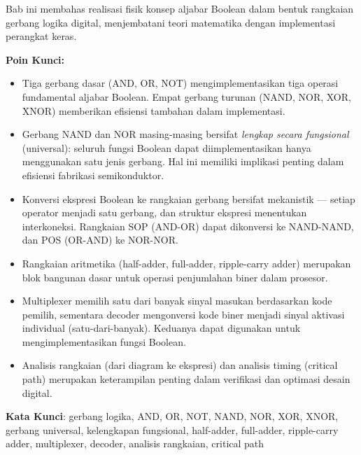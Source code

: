 \documentclass[../main]{subfiles}
\begin{document}
\begin{rangkuman}
Bab ini membahas realisasi fisik konsep aljabar Boolean dalam bentuk rangkaian gerbang logika digital, menjembatani teori matematika dengan implementasi perangkat keras.

\textbf{Poin Kunci:}
\begin{itemize}
  \item Tiga gerbang dasar (AND, OR, NOT) mengimplementasikan tiga operasi fundamental aljabar Boolean. Empat gerbang turunan (NAND, NOR, XOR, XNOR) memberikan efisiensi tambahan dalam implementasi.
  \item Gerbang NAND dan NOR masing-masing bersifat \textit{lengkap secara fungsional} (universal): seluruh fungsi Boolean dapat diimplementasikan hanya menggunakan satu jenis gerbang. Hal ini memiliki implikasi penting dalam efisiensi fabrikasi semikonduktor.
  \item Konversi ekspresi Boolean ke rangkaian gerbang bersifat mekanistik --- setiap operator menjadi satu gerbang, dan struktur ekspresi menentukan interkoneksi. Rangkaian SOP (AND-OR) dapat dikonversi ke NAND-NAND, dan POS (OR-AND) ke NOR-NOR.
  \item Rangkaian aritmetika (half-adder, full-adder, ripple-carry adder) merupakan blok bangunan dasar untuk operasi penjumlahan biner dalam prosesor.
  \item Multiplexer memilih satu dari banyak sinyal masukan berdasarkan kode pemilih, sementara decoder mengonversi kode biner menjadi sinyal aktivasi individual (satu-dari-banyak). Keduanya dapat digunakan untuk mengimplementasikan fungsi Boolean.
  \item Analisis rangkaian (dari diagram ke ekspresi) dan analisis timing (critical path) merupakan keterampilan penting dalam verifikasi dan optimasi desain digital.
\end{itemize}

\textbf{Kata Kunci}: gerbang logika, AND, OR, NOT, NAND, NOR, XOR, XNOR, gerbang universal, kelengkapan fungsional, half-adder, full-adder, ripple-carry adder, multiplexer, decoder, analisis rangkaian, critical path
\end{rangkuman}

\ifSubfilesClassLoaded{
  \renewcommand{\bibname}{Daftar Pustaka}
  
  
}{}
\end{document}
